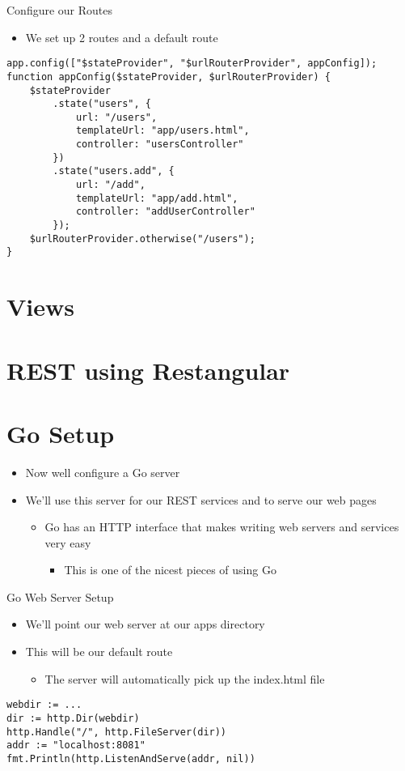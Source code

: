 \documentclass[presentation]{beamer}
\begin{document}
\begin{frame}[fragile,label=sec-3-3]{Configure our Routes}
 \begin{itemize}
\item We set up 2 routes and a default route
\end{itemize}
\begin{verbatim}
app.config(["$stateProvider", "$urlRouterProvider", appConfig]);
function appConfig($stateProvider, $urlRouterProvider) {
    $stateProvider
        .state("users", {
            url: "/users",
            templateUrl: "app/users.html",
            controller: "usersController"
        })
        .state("users.add", {
            url: "/add",
            templateUrl: "app/add.html",
            controller: "addUserController"
        });
    $urlRouterProvider.otherwise("/users");
}
\end{verbatim}
\end{frame}

\section{Views}
\label{sec-4}

\section{REST using Restangular}
\label{sec-5}

\section{Go Setup}
\label{sec-6}
\begin{itemize}
\item Now well configure a Go server
\item We'll use this server for our REST services and to serve our web pages
\begin{itemize}
\item Go has an HTTP interface that makes writing web servers and services very easy
\begin{itemize}
\item This is one of the nicest pieces of using Go
\end{itemize}
\end{itemize}
\end{itemize}

\begin{frame}[fragile,label=sec-6-1]{Go Web Server Setup}
 \begin{itemize}
\item We'll point our web server at our apps directory
\item This will be our default route
\begin{itemize}
\item The server will automatically pick up the index.html file
\end{itemize}
\end{itemize}
\begin{verbatim}
webdir := ...
dir := http.Dir(webdir)
http.Handle("/", http.FileServer(dir))
addr := "localhost:8081"
fmt.Println(http.ListenAndServe(addr, nil))
\end{verbatim}
\end{frame}
\end{document}
